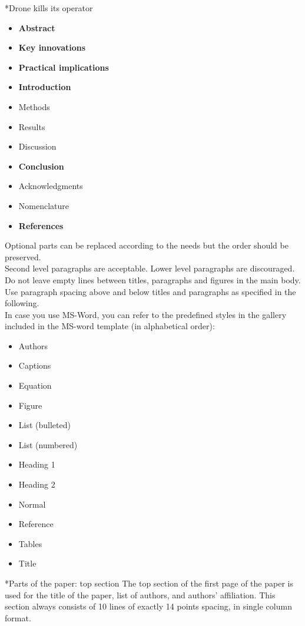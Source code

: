 \documentclass[twocolumn, a4paper,10pt]{article}
\makeatletter
\renewcommand\section{\@startsection{section}{1}{\z@}{3pt}{3pt}{\normalfont\large\bfseries}}
\makeatother
\begin{document}
\section*{Drone kills its operator}

\begin{itemize}
\item \textbf{Abstract}
\item \textbf{Key innovations}
\item \textbf{Practical implications}
\item \textbf{Introduction}
\item Methods
\item Results
\item Discussion
\item \textbf{Conclusion}
\item Acknowledgments
\item Nomenclature
\item \textbf{References}
\end{itemize}
Optional parts can be replaced according to the needs but the order should be preserved.\\
Second level paragraphs are acceptable. Lower level paragraphs are discouraged.\\
Do not leave empty lines between titles, paragraphs and figures in the main body. Use paragraph spacing above and below titles and paragraphs as specified in the following. \\
In case you use MS-Word, you can refer to the predefined styles in the gallery included in the MS-word template (in alphabetical order):
\begin{itemize}
\item Authors
\item Captions
\item Equation
\item Figure
\item List (bulleted)
\item List (numbered)
\item Heading 1
\item Heading 2
\item Normal
\item Reference
\item Tables
\item Title
\end{itemize}
\section*{Parts of the paper: top section}
The top section of the first page of the paper is used for the title of the paper, list of authors, and authors' affiliation. This section always consists of 10 lines of exactly 14 points spacing, in single column format.
\end{document}
